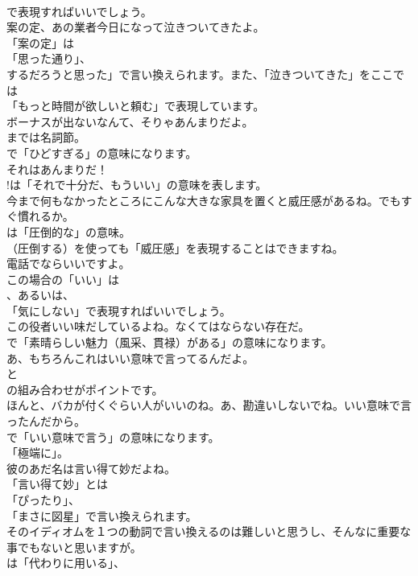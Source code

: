 \documentclass[8pt]{extreport}
\begin{document}
\begin{CJK}{UTF8}{min}
\\	で表現すればいいでしょう。	
\\	案の定、あの業者今日になって泣きついてきたよ。 
\\	「案の定」は
\\	「思った通り」、
\\	するだろうと思った」で言い換えられます。また、「泣きついてきた」をここでは
\\	「もっと時間が欲しいと頼む」で表現しています。	
\\	ボーナスが出ないなんて、そりゃあんまりだよ。 
\\	までは名詞節。
\\	で「ひどすぎる」の意味になります。	
\\	それはあんまりだ！ 
\\	!は「それで十分だ、もういい」の意味を表します。	
\\	今まで何もなかったところにこんな大きな家具を置くと威圧感があるね。でもすぐ慣れるか。 
\\	は「圧倒的な」の意味。
\\	（圧倒する）を使っても「威圧感」を表現することはできますね。	
\\	電話でならいいですよ。 
\\	この場合の「いい」は
\\	、あるいは、
\\	「気にしない」で表現すればいいでしょう。	
\\	この役者いい味だしているよね。なくてはならない存在だ。 
\\	で「素晴らしい魅力（風采、貫禄）がある」の意味になります。	
\\	あ、もちろんこれはいい意味で言ってるんだよ。 
\\	と 
\\	の組み合わせがポイントです。	
\\	ほんと、バカが付くぐらい人がいいのね。あ、勘違いしないでね。いい意味で言ったんだから。 
\\	で「いい意味で言う」の意味になります。
\\	「極端に」。	
\\	彼のあだ名は言い得て妙だよね。 
\\	「言い得て妙」とは
\\	「ぴったり」、
\\	「まさに図星」で言い換えられます。	
\\	そのイディオムを１つの動詞で言い換えるのは難しいと思うし、そんなに重要な事でもないと思いますが。 
\\	は「代わりに用いる」、

\end{CJK}
\end{document}
